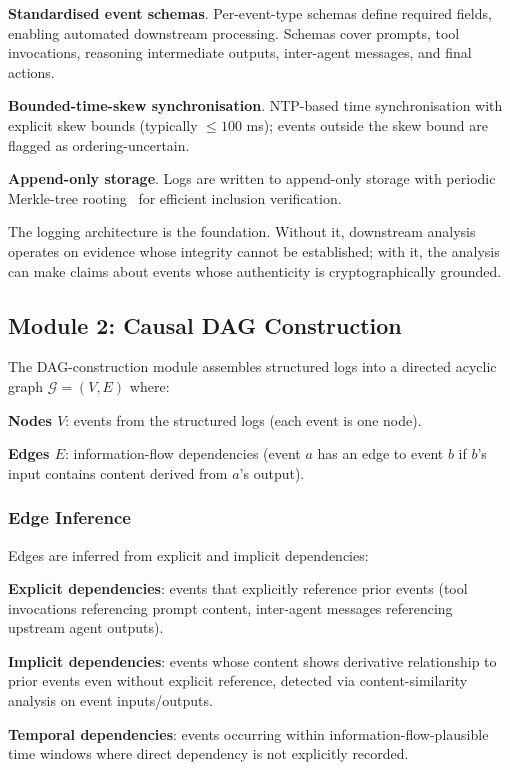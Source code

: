 \documentclass[sigconf,nonacm]{acmart}
\begin{document}
\textbf{Standardised event schemas}. Per-event-type schemas define
required fields, enabling automated downstream processing. Schemas
cover prompts, tool invocations, reasoning intermediate outputs,
inter-agent messages, and final actions.

\textbf{Bounded-time-skew synchronisation}. NTP-based time
synchronisation with explicit skew bounds (typically $\leq 100$ ms);
events outside the skew bound are flagged as ordering-uncertain.

\textbf{Append-only storage}. Logs are written to append-only
storage with periodic Merkle-tree
rooting~\cite{crosby2024merkleaudit} for efficient inclusion
verification.

The logging architecture is the foundation. Without it, downstream
analysis operates on evidence whose integrity cannot be established;
with it, the analysis can make claims about events whose
authenticity is cryptographically grounded.

\subsection{Module 2: Causal DAG Construction}

The DAG-construction module assembles structured logs into a
directed acyclic graph $\mathcal{G} = (V, E)$ where:

\textbf{Nodes $V$}: events from the structured logs (each event is
one node).

\textbf{Edges $E$}: information-flow dependencies (event $a$ has an
edge to event $b$ if $b$'s input contains content derived from
$a$'s output).

\subsubsection{Edge Inference}

Edges are inferred from explicit and implicit dependencies:

\textbf{Explicit dependencies}: events that explicitly reference
prior events (tool invocations referencing prompt content,
inter-agent messages referencing upstream agent outputs).

\textbf{Implicit dependencies}: events whose content shows
derivative relationship to prior events even without explicit
reference, detected via content-similarity analysis on event
inputs/outputs.

\textbf{Temporal dependencies}: events occurring within
information-flow-plausible time windows where direct dependency is
not explicitly recorded.
\end{document}
